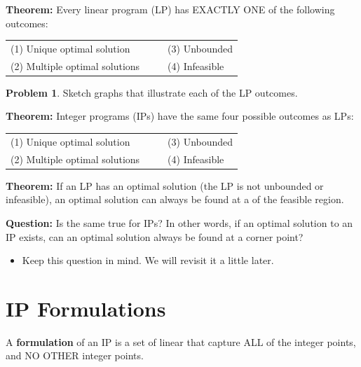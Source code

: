 \documentclass[11pt]{article}
\theoremstyle{definition}
\newtheorem{problem}{Problem}
\newcommand{\answerbox}[3]{%
  \fbox{%
    \begin{minipage}[#1]{#2}
      \hfill\vspace{#3}
    \end{minipage}
  }
}
\newcommand{\wordbox}{\answerbox{c}{1.2in}{.7cm}}
\begin{document}
\begin{tcolorbox}
\textbf{Theorem:} Every linear program (LP) has EXACTLY ONE of the following outcomes: 

\medskip
\begin{tabular}{ll}
(1) Unique optimal solution  ~~~~~& (3) Unbounded    \\
(2) Multiple optimal solutions & (4) Infeasible
\end{tabular}
\end{tcolorbox}

\begin{problem}
Sketch graphs that illustrate each of the  LP outcomes.
\end{problem}

\answerbox{c}{.5\textwidth}{2in} \answerbox{c}{.5\textwidth}{2in}

\answerbox{c}{.5\textwidth}{2in} \answerbox{c}{.5\textwidth}{2in}


\begin{tcolorbox}
\textbf{Theorem:}  Integer programs (IPs) have the same four possible outcomes as LPs: 

\medskip
\begin{tabular}{ll}
(1) Unique optimal solution  ~~~~~& (3) Unbounded    \\
(2) Multiple optimal solutions & (4) Infeasible
\end{tabular}

\end{tcolorbox}
\begin{tcolorbox}
\textbf{Theorem:} If an LP has an optimal solution (the LP is not unbounded or infeasible), an optimal solution can always be found at a 
\wordbox \wordbox %
of the feasible region.
\end{tcolorbox}

\textbf{Question:}  Is the same true for IPs?  In other words, if an optimal solution to an IP exists, can an optimal solution always be found at a corner point?  
\begin{itemize}
\item Keep this question in mind.  We will revisit it a little later.
\end{itemize}

\vfill

\section{IP Formulations}

\begin{tcolorbox}
A \textbf{formulation} of an IP is a set of linear \wordbox that capture ALL of the \wordbox integer points, and NO OTHER integer points.
\end{tcolorbox}
\end{document}
